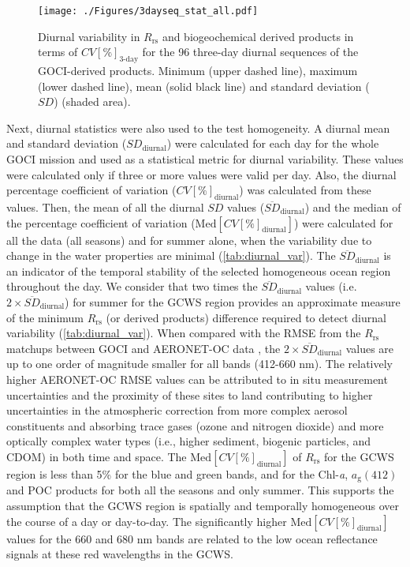 \documentclass[remotesensing,article,submit,moreauthors,pdftex,10pt,a4paper]{Definitions/mdpi}
\begin{document}
\begin{figure}[htbp!]
\centering
\texttt{[image: ./Figures/3dayseq\_stat\_all.pdf]}
\caption{Diurnal variability in $R_\text{rs}$ and biogeochemical derived products in terms of $CV[\%]_\text{3-day}$ for the 96 three-day diurnal sequences of the GOCI-derived products. Minimum (upper dashed line), maximum (lower dashed line), mean (solid black line) and standard deviation ($SD$) (shaded area).\label{fig:3dayseq_stats} } 
\end{figure}
Next, diurnal statistics were also used to the test homogeneity. A diurnal mean and standard deviation ($SD_\text{diurnal}$) were calculated for each day for the whole GOCI mission and used as a statistical metric for diurnal variability. These values were calculated only if three or more values were valid per day. Also, the diurnal percentage coefficient of variation ($CV[\%]_\text{diurnal}$) was calculated from these values. Then, the mean of all the diurnal $SD$ values ($\overline{SD}_\text{diurnal}$) and the median of the percentage coefficient of variation ($\text{Med}[CV[\%]_\text{diurnal}]$) were calculated for all the data (all seasons) and for summer alone, when the variability due to change in the water properties are minimal (\autoref{tab:diurnal_var}). The $\overline{SD}_\text{diurnal}$ is an indicator of the temporal stability of the selected homogeneous ocean region throughout the day. We consider that two times the $\overline{SD}_\text{diurnal}$ values (i.e. $2\times \overline{SD}_\text{diurnal}$) for summer for the GCWS region provides an approximate measure of the minimum $R_\text{rs}$ (or derived products) difference required to detect diurnal variability (\autoref{tab:diurnal_var}). When compared with the RMSE from the $R_\text{rs}$ matchups between GOCI and AERONET-OC data \cite{Concha_2018a}, the $2\times \overline{SD}_\text{diurnal}$ values are up to one order of magnitude smaller for all bands (412-660 nm). The relatively higher AERONET-OC RMSE values can be attributed to in situ measurement uncertainties and the proximity of these sites to land contributing to higher uncertainties in the atmospheric correction from more complex aerosol constituents and absorbing trace gases (ozone and nitrogen dioxide) and more optically complex water types (i.e., higher sediment, biogenic particles, and CDOM) in both time and space. The $\text{Med}[CV[\%]_\text{diurnal}]$ of $R_\text{rs}$ for the GCWS region is less than 5\% for the blue and green bands, and for the Chl-{\it a}, $a_\text{g}(412)$ and POC products for both all the seasons and only summer. This supports the assumption that the GCWS region is spatially and temporally homogeneous over the course of a day or day-to-day. The significantly higher $\text{Med}[CV[\%]_\text{diurnal}]$ values for the 660 and 680 nm bands are related to the low ocean reflectance signals at these red wavelengths in the GCWS. 
\end{document}
